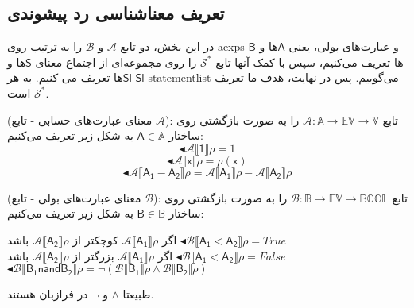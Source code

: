\subsection{تعریف معناشناسی رد پیشوندی}
در این بخش، دو تابع $\mathcal{A}$ و $\mathcal{B}$ را به ترتیب روی \glspl{aexp} و عبارت‌های بولی، یعنی $\mathsf{A}$ها و $\mathsf{B}$ها تعریف می‌کنیم، سپس با کمک آنها تابع $\mathcal{S^*}$ را روی  مجموعه‌ای از اجتماع معنای $\mathsf{S}$ها و $\mathsf{Sl}$ها تعریف می کنیم. به هر $\mathsf{Sl}$ \gls{statementlist} می‌گوییم. پس در نهایت، هدف ما تعریف  $\mathcal{S^*}$ است.


\begin{defn}
	(معنای عبارت‌های حسابی - تابع $\mathcal{A}$): تابع 
	$\mathcal{A}:\mathbb{A}\rightarrow \mathbb{EV} \rightarrow \mathbb{V}$
	را به صورت بازگشتی روی ساختار 
	$\mathsf{A} \in \mathbb{A}$
	به شکل زیر تعریف می‌کنیم:
	$$\blacktriangleleft\mathcal{A\llbracket\mathsf{1}\rrbracket\rho = }1     $$
	$$\blacktriangleleft\mathcal{A\llbracket\mathsf{x}\rrbracket\rho = } \rho(\mathsf{x})          $$
	$$\blacktriangleleft\mathcal{A\llbracket\mathsf{A_1-A_2}\rrbracket\rho = }\mathcal{A\llbracket\mathsf{A_1}\rrbracket\rho }- \mathcal{A\llbracket\mathsf{A_2}\rrbracket\rho }       $$
	
\end{defn}

\begin{defn}
	(معنای عبارت‌های بولی - تابع $\mathcal{B}$): تابع 
	$\mathcal{B}: \mathbb{B} \rightarrow \mathbb{EV} \rightarrow \mathbb{BOOL}$
	را به صورت بازگشتی روی ساختار 
	$\mathsf{B} \in \mathbb{B}$
	به شکل زیر تعریف می‌کنیم:
	
	\begin{center}
		اگر $\mathcal{A\llbracket\mathsf{A_1}\rrbracket\rho }$ کوچکتر از $\mathcal{A\llbracket\mathsf{A_2}\rrbracket\rho }$ باشد
		$\blacktriangleleft\mathcal{B\llbracket\mathsf{A_1<A_2}\rrbracket\rho = } True   \hspace{2cm}  $\\
		اگر $\mathcal{A\llbracket\mathsf{A_1}\rrbracket\rho }$ بزرگتر از $\mathcal{A\llbracket\mathsf{A_2}\rrbracket\rho }$ باشد
		$\blacktriangleleft\mathcal{B\llbracket\mathsf{A_1<A_2}\rrbracket\rho = } False   \hspace{2cm}  $\\
		$ \blacktriangleleft\mathcal{B\llbracket\mathsf{B_1 nand B_2}\rrbracket\rho = } \neg(\mathcal{B\llbracket\mathsf{B_1}\rrbracket\rho}   \wedge \mathcal{B\llbracket\mathsf{B_2}\rrbracket\rho}) $
	\end{center}

طبیعتا $\wedge$ و $\neg$ در فرازبان هستند.
\end{defn}

